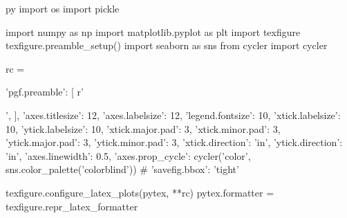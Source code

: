 \begin{pythontexcustomcode}{py}
import os
import pickle

import numpy as np
import matplotlib.pyplot as plt
import texfigure
texfigure.preamble_setup()
import seaborn as sns
from cycler import cycler

rc = {
    'pgf.preamble': [
        r'\usepackage{siunitx}',
    ],
    'axes.titlesize': 12,
    'axes.labelsize': 12,
    'legend.fontsize': 10,
    'xtick.labelsize': 10,
    'ytick.labelsize': 10,
    'xtick.major.pad': 3,
    'xtick.minor.pad': 3,
    'ytick.major.pad': 3,
    'ytick.minor.pad': 3,
    'xtick.direction': 'in',
    'ytick.direction': 'in',
    'axes.linewidth': 0.5,
    'axes.prop_cycle': cycler('color', sns.color_palette('colorblind'))
# 'savefig.bbox': 'tight'
}
texfigure.configure_latex_plots(pytex, **rc)
pytex.formatter = texfigure.repr_latex_formatter
\end{pythontexcustomcode}
\begin{pycode}
\end{pycode}